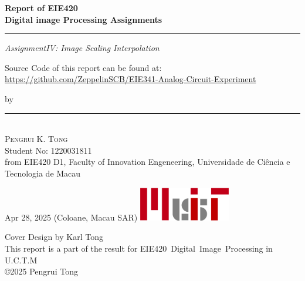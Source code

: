 \begin{titlepage}
    \ActivateWarningFilters[latex]

    \parbox{1\textwidth}{ %
		{\Huge\bfseries Report of EIE420 \\[0.15\baselineskip] 
            Digital image Processing Assignments}\\[0.15\baselineskip] %
		\rule{1\textwidth}{1pt} %
        {\Large\textit{AssignmentIV: Image Scaling Interpolation}}
        \newline
    }
    \parbox{1\textwidth}{
        \vspace{1\baselineskip}
        \large
        Source Code of this report can be found at:\newline
        \url{https://github.com/ZeppelinSCB/EIE341-Analog-Circuit-Experiment}
        \newline
    }
    \vspace{100pt} %
    \parbox{1\textwidth}{
        {\large by}\\[1.5\baselineskip]
        {\rule[1pt]{200pt}{1pt}} \\[1.25pt]
        {\huge\textsc{Pengrui K. Tong}
            }\\
        {\large{Student No: 1220031811}} \\
        \large from EIE420 D1, \newline
        Faculty of Innovation Engeneering, \newline
        Universidade de Ciência e Tecnologia de Macau
    }
		

    \vspace*{\fill}
		Apr 28, 2025 \newline 
        (Coloane, Macau SAR)
        \vspace{0.7\baselineskip}\newline
        \includegraphics[width = 40mm]{../Header/MUIT_origin.png}\par
        {\small Cover Design by Karl Tong}\\[0.25pt]
        {\small This report is a part of the result for}
        {\small EIE420~Digital~Image~Processing in U.C.T.M}\\[0.25pt]
        {\small \copyright 2025 Pengrui Tong}
\end{titlepage}